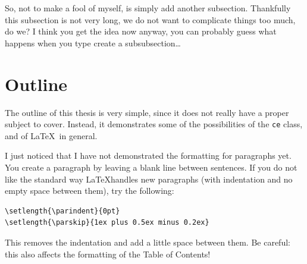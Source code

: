 So, not to make a fool of myself, is simply add another subsection. Thankfully this subsection is not very long, we do not want to complicate things too much, do we? I think you get the idea now anyway, you can probably guess what happens when you type create a subsubsection\ldots

\section{Outline}

The outline of this thesis is very simple, since it does not really have a proper subject to cover. Instead, it demonstrates some of the possibilities of the \texttt{ce} class, and of \LaTeX\ in general. 

I just noticed that I have not demonstrated the formatting for paragraphs yet. You create a paragraph by leaving a blank line between sentences. If you do not like the standard way \LaTeX handles new paragraphs (\ie with indentation and no empty space between them), try the following:
\begin{verbatim}
\setlength{\parindent}{0pt}
\setlength{\parskip}{1ex plus 0.5ex minus 0.2ex}
\end{verbatim}
This removes the indentation and add a little space between them. Be careful: this also affects the formatting of the Table of Contents!
